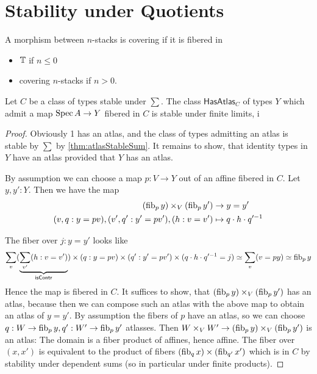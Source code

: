 \documentclass{article}
\begin{document}
\section{Stability under Quotients}
\begin{definition}
	A morphism between $n$-stacks is covering if it is fibered in 
	\begin{itemize}
		\item $\mathbb{T}$ if $n \le 0$
		\item covering $n$-stacks if $n > 0$.
	\end{itemize}
\end{definition}
\begin{lemma}{\label{lemma:havingAbstractAtlasClosedUnderId}}
	Let $C$ be a class of types stable under $\sum$. %
	The class $\mathsf{HasAtlas}_C$ of types $Y$ which admit a map $\operatorname{Spec} A \to Y$ fibered in $C$ is stable under finite limits, i %
\end{lemma}
\begin{proof}
	Obviously 1 has an atlas, and the class of types admitting an atlas is stable by $\sum$ by \ref{thm:atlasStableSum}.
	It remains to show, that identity types in $Y$ have an atlas provided that $Y$ has an atlas.

	By assumption we can choose a map $p : V \to Y$ out of an affine fibered in $C$. Let $y,y' : Y$.  Then we have the map
	\begin{align*}
		(\operatorname{fib}_p y) \times_V (\operatorname{fib}_p y') &\to y = y' \\
		(v , q : y = p v) , (v', q' : y' = p v') , (h : v = v') &\mapsto q \cdot h \cdot q'^{-1}
	\end{align*}

	The fiber over $j : y = y'$ looks like  %
	\[
	\sum_{v}  ( \underbrace{\sum_{v'} (h : v = v')}_{\mathsf{isContr}}) \times (q : y = p v) \times (q'  : y' = p v') \times (q \cdot h \cdot q'^{-1} = j) \simeq \sum_v (v = py) \simeq \operatorname{fib}_p y
	\]
	Hence the map is fibered in $C$. It suffices to show, that	$(\operatorname{fib}_p y) \times_V (\operatorname{fib}_p y')$ has an atlas, because then we can compose such an atlas with the above map to obtain an atlas of $y = y'$.
	By assumption the fibers of $p$ have an atlas, so we can choose $q : W \to \operatorname{fib}_p y, q' : W' \to \operatorname{fib}_p y'$ atlasses. Then $W \times_V W' \to (\operatorname{fib}_p y) \times_V (\operatorname{fib}_p y')$ is an atlas: The domain is a fiber product of affines, hence affine. The fiber over $(x,x')$ is equivalent to the product of fibers $(\operatorname{fib}_q x) \times (\operatorname{fib}_{q'} x')$ which is in $C$ by stability under dependent sums (so in particular under finite products).
	
\end{proof}
\end{document}
